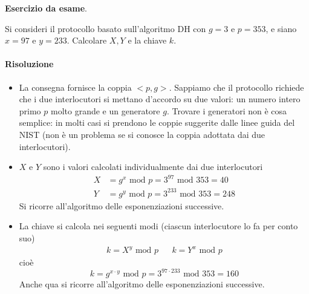 \begin{framed}
	\noindent \textbf{Esercizio da esame}.
	
	\noindent Si consideri il protocollo basato sull’algoritmo DH con $g = 3$ e $p = 353$, e siano $x = 97$ e $y = 233$.
	Calcolare $X, Y$ e la chiave $k$. 
	
	\paragraph{Risoluzione} 
	\begin{itemize}
		\item La consegna fornisce la coppia $<p,g>$. Sappiamo che il protocollo richiede che i due interlocutori si mettano d'accordo su due valori: un numero intero primo $p$ molto grande e un generatore $g$. Trovare i generatori non è cosa semplice: in molti casi si prendono le coppie suggerite dalle linee guida del NIST (non è un problema se si conosce la coppia adottata dai due interlocutori). 
		\item $X$ e $Y$ sono i valori calcolati individualmente dai due interlocutori 
		\begin{align*}
			X&=g^x \text{ mod } p=3^{97}\text{ mod } 353=40\\
			Y&=g^y \text{ mod } p=3^{233}\text{ mod } 353=248
		\end{align*}
		Si ricorre all'algoritmo delle esponenziazioni successive. 
		\item La chiave si calcola nei seguenti modi (ciascun interlocutore lo fa per conto suo)
		\begin{align*}
			k=X^y \text{ mod }p&&k=Y^x \text{ mod }p
		\end{align*}
		cioè 
		$$k=g^{x\cdot y} \text{ mod } p = 3^{97 \cdot 233} \text{ mod } 353=160$$
		Anche qua si ricorre all'algoritmo delle esponenziazioni successive. 
	\end{itemize}
\end{framed} 

